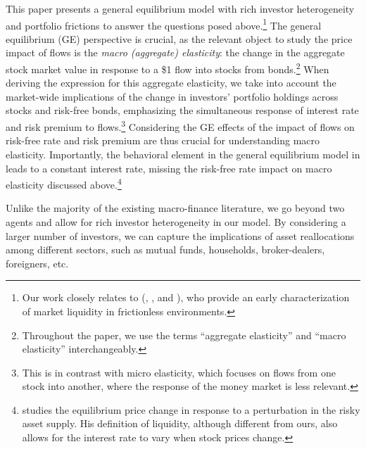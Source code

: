 This paper presents %
a general equilibrium model with rich investor heterogeneity and portfolio frictions to answer the questions posed above.\footnote{Our work closely relates to \citeauthor{johnson2006dynamic} (\citeyear{johnson2006dynamic}, \citeyear{johnson2008volume}, and \citeyear{johnson2009liquid}), who provide an early characterization of market liquidity in frictionless environments.}
The general equilibrium (GE) perspective is crucial, as the relevant object to study the price impact of flows is the \textit{macro (aggregate) elasticity}:  %
the change in the aggregate stock market value in response to a \$1 flow into stocks from bonds.\footnote{Throughout the paper, we use the terms ``aggregate elasticity'' and ``macro elasticity'' interchangeably.} When deriving the expression for this aggregate elasticity, we take into account the market-wide implications of the change in investors' portfolio holdings across stocks and risk-free bonds, emphasizing the simultaneous response of interest rate and risk premium to flows.\footnote{This is in contrast with micro elasticity, which focuses on flows from one stock into another, where the response of the money market is less relevant.} Considering the GE effects of the impact of flows on risk-free rate and risk premium are thus crucial for understanding macro elasticity. Importantly, the behavioral element in the general equilibrium model in \cite{gabaix2020search} leads to a constant interest rate, missing the risk-free rate impact on macro elasticity discussed above.\footnote{\cite{johnson2006dynamic} studies the equilibrium price change in response to a perturbation in the risky asset supply. His definition of liquidity, although different from ours, also allows for the interest rate to vary when stock prices change.}


Unlike the majority of the existing macro-finance literature, we go beyond two agents and allow for rich investor heterogeneity in our model. 
By considering a larger number of investors, we can capture the implications of asset reallocations among different sectors, such as mutual funds, households, broker-dealers, foreigners, etc. 

